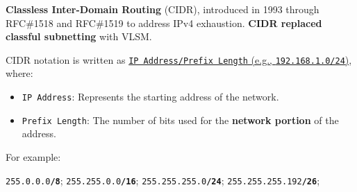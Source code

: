 \begin{Def}

    \textbf{Classless Inter-Domain Routing} (CIDR), introduced in 1993 through RFC\#1518 and RFC\#1519 to address IPv4 exhaustion.
    \textbf{CIDR replaced classful subnetting} with VLSM.

    \noindent
    CIDR notation is written as \underline{\texttt{IP Address/Prefix Length} (e.g., \texttt{192.168.1.0/24})}, where:
    \begin{itemize}
        \item \texttt{IP Address}: Represents the starting address of the network.
        \item \texttt{Prefix Length}: The number of bits used for the \textbf{network portion} of the address.\\
    \end{itemize}

    \vspace{-1em}
    \noindent
    For example:\\

        \vspace{-1em}
        \begin{center}
            \large
            \texttt{255.0.0.0\textbf{/8}}; \hspace{.2em} \texttt{255.255.0.0\textbf{/16}}; \hspace{.2em} \texttt{255.255.255.0\textbf{/24}}; \hspace{.2em} \texttt{255.255.255.192\textbf{/26}};
            \normalsize
        \end{center}
    \hfill \cite{fuller_cidr_rfc1519}
\end{Def}


